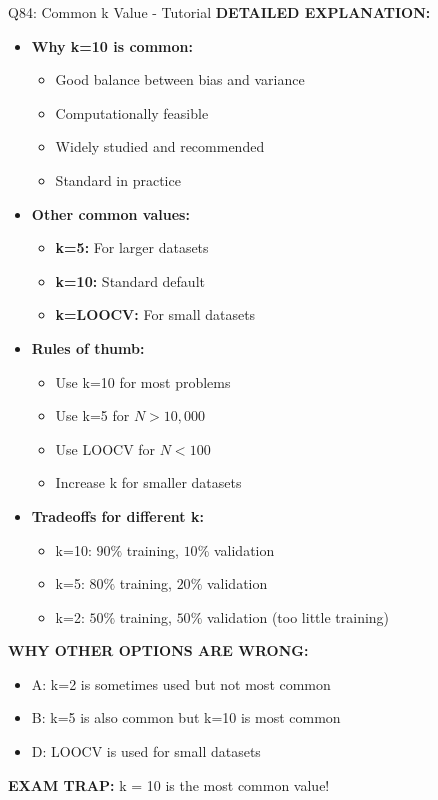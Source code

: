 \documentclass[8pt]{beamer}
\begin{document}
\begin{frame}{Q84: Common k Value - Tutorial}
		\vspace{0.05cm}
		\textbf{DETAILED EXPLANATION:}
		\begin{itemize}
			\item \textbf{Why k=10 is common:}
			\begin{itemize}
				\item Good balance between bias and variance
				\item Computationally feasible
				\item Widely studied and recommended
				\item Standard in practice
			\end{itemize}
			\item \textbf{Other common values:}
			\begin{itemize}
				\item \textbf{k=5:} For larger datasets
				\item \textbf{k=10:} Standard default
				\item \textbf{k=LOOCV:} For small datasets
			\end{itemize}
			\item \textbf{Rules of thumb:}
			\begin{itemize}
				\item Use k=10 for most problems
				\item Use k=5 for $N > 10,000$
				\item Use LOOCV for $N < 100$
				\item Increase k for smaller datasets
			\end{itemize}
			\item \textbf{Tradeoffs for different k:}
			\begin{itemize}
				\item k=10: $90\%$ training, $10\%$ validation
				\item k=5: $80\%$ training, $20\%$ validation
				\item k=2: $50\%$ training, $50\%$ validation (too little training)
			\end{itemize}
		\end{itemize}
		
		\vspace{0.05cm}
		\textcolor{myred}{\textbf{WHY OTHER OPTIONS ARE WRONG:}}
		\begin{itemize}
			\item \textcolor{myred}{A:} k=2 is sometimes used but not most common
			\item \textcolor{myred}{B:} k=5 is also common but k=10 is most common
			\item \textcolor{myred}{D:} LOOCV is used for small datasets
		\end{itemize}
		
		\textcolor{myred}{\textbf{EXAM TRAP:}} k = 10 is the most common value!
	\end{frame}
	
\end{document}
